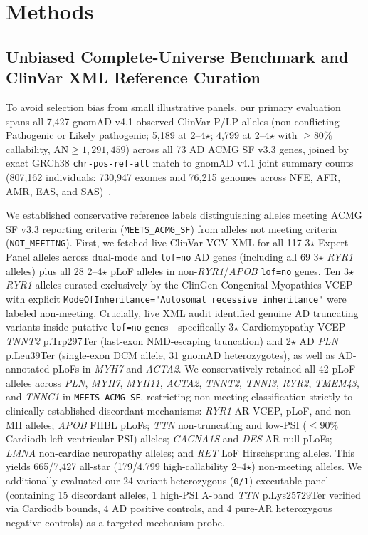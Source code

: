\documentclass[11pt,letterpaper]{article}
\begin{document}
\section{Methods}
\subsection{Unbiased Complete-Universe Benchmark and ClinVar XML Reference Curation}
To avoid selection bias from small illustrative panels, our primary evaluation spans all 7,427 gnomAD v4.1-observed ClinVar P/LP alleles (non-conflicting Pathogenic or Likely pathogenic; 5,189 at 2--4$\star$; 4,799 at 2--4$\star$ with $\ge 80\%$ callability, $\text{AN}\ge 1{,}291{,}459$) across all 73 AD ACMG SF v3.3 genes, joined by exact GRCh38 \texttt{chr-pos-ref-alt} match to gnomAD v4.1 joint summary counts (807,162 individuals: 730,947 exomes and 76,215 genomes across NFE, AFR, AMR, EAS, and SAS)~\citep{chen2024gnomadv3,gnomadv41release2024}.

We established conservative reference labels distinguishing alleles meeting ACMG SF v3.3 reporting criteria (\texttt{MEETS\_ACMG\_SF}) from alleles not meeting criteria (\texttt{NOT\_MEETING}). First, we fetched live ClinVar VCV XML for all 117 3$\star$ Expert-Panel alleles across dual-mode and \texttt{lof=no} AD genes (including all 69 3$\star$ \textit{RYR1} alleles) plus all 28 2--4$\star$ pLoF alleles in non-\textit{RYR1}/\textit{APOB} \texttt{lof=no} genes. Ten 3$\star$ \textit{RYR1} alleles curated exclusively by the ClinGen Congenital Myopathies VCEP with explicit \texttt{ModeOfInheritance="Autosomal recessive inheritance"} were labeled non-meeting. Crucially, live XML audit identified genuine AD truncating variants inside putative \texttt{lof=no} genes---specifically 3$\star$ Cardiomyopathy VCEP \textit{TNNT2} p.Trp297Ter (last-exon NMD-escaping truncation) and 2$\star$ AD \textit{PLN} p.Leu39Ter (single-exon DCM allele, 31 gnomAD heterozygotes), as well as AD-annotated pLoFs in \textit{MYH7} and \textit{ACTA2}. We conservatively retained all 42 pLoF alleles across \textit{PLN}, \textit{MYH7}, \textit{MYH11}, \textit{ACTA2}, \textit{TNNT2}, \textit{TNNI3}, \textit{RYR2}, \textit{TMEM43}, and \textit{TNNC1} in \texttt{MEETS\_ACMG\_SF}, restricting non-meeting classification strictly to clinically established discordant mechanisms: \textit{RYR1} AR VCEP, pLoF, and non-MH alleles; \textit{APOB} FHBL pLoFs; \textit{TTN} non-truncating and low-PSI ($\le 90\%$ Cardiodb left-ventricular PSI) alleles; \textit{CACNA1S} and \textit{DES} AR-null pLoFs; \textit{LMNA} non-cardiac neuropathy alleles; and \textit{RET} LoF Hirschsprung alleles. This yields 665/7,427 all-star (179/4,799 high-callability 2--4$\star$) non-meeting alleles. We additionally evaluated our 24-variant heterozygous (\texttt{0/1}) executable panel (containing 15 discordant alleles, 1 high-PSI A-band \textit{TTN} p.Lys25729Ter verified via Cardiodb bounds, 4 AD positive controls, and 4 pure-AR heterozygous negative controls) as a targeted mechanism probe.
\end{document}
